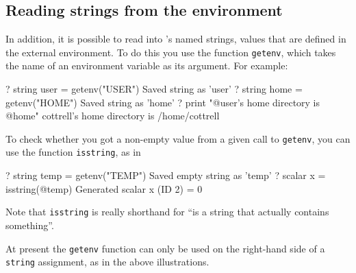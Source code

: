 \subsection{Reading strings from the environment}

In addition, it is possible to read into 's named strings,
values that are defined in the external environment.  To do this you
use the function \texttt{getenv}, which takes the name of an environment
variable as its argument.  For example:
%
\begin{code}
? string user = getenv("USER")
Saved string as 'user'
? string home = getenv("HOME")
Saved string as 'home'
? print "@user's home directory is @home"
cottrell's home directory is /home/cottrell
\end{code}
%
To check whether you got a non-empty value from a given call to
\texttt{getenv}, you can use the function \texttt{isstring}, as in
%
\begin{code}
? string temp = getenv("TEMP")
Saved empty string as 'temp'
? scalar x = isstring(@temp)
Generated scalar x (ID 2) = 0
\end{code}
%
Note that \texttt{isstring} is really shorthand for ``is a string that
actually contains something''.  

At present the \texttt{getenv} function can only be used on the
right-hand side of a \texttt{string} assignment, as in the above
illustrations.
    

